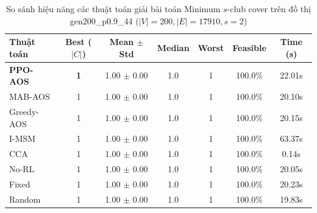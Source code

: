 \begin{table}[htbp]
\centering
\caption{So sánh hiệu năng các thuật toán giải bài toán Minimum $s$-club cover trên đồ thị gen200_p0.9_44 ($|V|=200, |E|=17910, s=2$)}
\label{tab:results_gen200_p0_9_44}
\begin{tabular}{lcccccc}
\hline
\textbf{Thuật toán} & \textbf{Best ($|C|$)} & \textbf{Mean $\pm$ Std} & \textbf{Median} & \textbf{Worst} & \textbf{Feasible} & \textbf{Time (s)} \\
\hline
\textbf{PPO-AOS} & \textbf{1} & 1.00 $\pm$ 0.00 & 1.0 & 1 & 100.0\% & 22.01s \\
MAB-AOS & 1 & 1.00 $\pm$ 0.00 & 1.0 & 1 & 100.0\% & 20.10s \\
Greedy-AOS & 1 & 1.00 $\pm$ 0.00 & 1.0 & 1 & 100.0\% & 20.15s \\
I-MSM & 1 & 1.00 $\pm$ 0.00 & 1.0 & 1 & 100.0\% & 63.37s \\
CCA & 1 & 1.00 $\pm$ 0.00 & 1.0 & 1 & 100.0\% & 0.14s \\
No-RL & 1 & 1.00 $\pm$ 0.00 & 1.0 & 1 & 100.0\% & 20.05s \\
Fixed & 1 & 1.00 $\pm$ 0.00 & 1.0 & 1 & 100.0\% & 20.23s \\
Random & 1 & 1.00 $\pm$ 0.00 & 1.0 & 1 & 100.0\% & 19.83s \\
\hline
\end{tabular}
\end{table}
